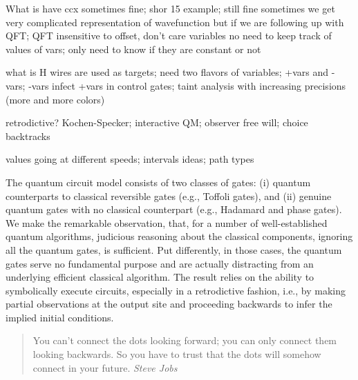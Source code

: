 \documentclass{article}
\begin{document}
\begin{refsection}
  What is have ccx
  sometimes fine; shor 15 example; still fine
  sometimes we get very complicated representation of wavefunction
  but if we are following up with QFT; QFT insensitive to offset, don't care variables
  no need to keep track of values of vars; only need to know if they are constant or not

  what is H wires are used as targets; need two flavors of variables; +vars and -vars;
  -vars infect +vars in control gates; taint analysis with increasing precisions (more
  and more colors)

  retrodictive? Kochen-Specker; interactive QM; observer free will; choice backtracks

  values going at different speeds; intervals ideas; path types

  
The quantum circuit model consists of two classes of gates: (i)
quantum counterparts to classical reversible gates (e.g., Toffoli
gates), and (ii) genuine quantum gates with no classical counterpart
(e.g., Hadamard and phase gates). We make the remarkable observation,
that, for a number of well-established quantum algorithms, judicious
reasoning about the classical components, ignoring all the quantum
gates, is sufficient. Put differently, in those cases, the quantum
gates serve no fundamental purpose and are actually distracting from
an underlying efficient classical algorithm. The result relies on the
ability to symbolically execute circuits, especially in a retrodictive
fashion, i.e., by making partial observations at the output site and
proceeding backwards to infer the implied initial conditions.


\begin{quote}
You can’t connect the dots looking forward; you can only connect them
looking backwards.  So you have to trust that the dots will somehow
connect in your future. \emph{Steve Jobs}
\end{quote}



\end{refsection}
\end{document}
